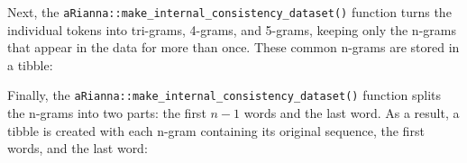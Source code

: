 \documentclass[11pt,]{article}
\newenvironment{Shaded}{\begin{snugshade}}{\end{snugshade}}
\newcommand{\CommentTok}[1]{\textcolor[rgb]{0.56,0.35,0.01}{\textit{#1}}}
\newcommand{\DataTypeTok}[1]{\textcolor[rgb]{0.13,0.29,0.53}{#1}}
\newcommand{\DecValTok}[1]{\textcolor[rgb]{0.00,0.00,0.81}{#1}}
\newcommand{\KeywordTok}[1]{\textcolor[rgb]{0.13,0.29,0.53}{\textbf{#1}}}
\newcommand{\NormalTok}[1]{#1}
\newcommand{\OperatorTok}[1]{\textcolor[rgb]{0.81,0.36,0.00}{\textbf{#1}}}
\newcommand{\StringTok}[1]{\textcolor[rgb]{0.31,0.60,0.02}{#1}}
\begin{document}
Next, the \texttt{aRianna::make\_internal\_consistency\_dataset()} function turns the individual tokens into tri-grams, 4-grams, and 5-grams, keeping only the n-grams that appear in the data for more than once. These common n-grams are stored in a tibble:

\begin{Shaded}
\end{Shaded}

Finally, the \texttt{aRianna::make\_internal\_consistency\_dataset()} function splits the n-grams into two parts: the first \(n-1\) words and the last word. As a result, a tibble is created with each n-gram containing its original sequence, the first words, and the last word:
\end{document}
